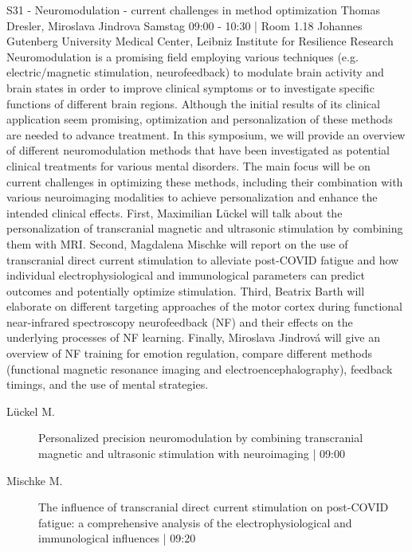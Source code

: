 
            \begin{symposium}
            {S31 - Neuromodulation - current challenges in method optimization}
            {Thomas Dresler, Miroslava Jindrova}
            {Samstag 09:00 - 10:30 | Room 1.18}
            {Johannes Gutenberg University Medical Center, Leibniz Institute for Resilience Research}
            Neuromodulation is a promising field employing various techniques (e.g. electric/magnetic stimulation, neurofeedback) to modulate brain activity and brain states in order to improve clinical symptoms or to investigate specific functions of different brain regions. Although the initial results of its clinical application seem promising, optimization and personalization of these methods are needed to advance treatment. In this symposium, we will provide an overview of different neuromodulation methods that have been investigated as potential clinical treatments for various mental disorders. The main focus will be on current challenges in optimizing these methods, including their combination with various neuroimaging modalities to achieve personalization and enhance the intended clinical effects. First, Maximilian Lückel will talk about the personalization of transcranial magnetic and ultrasonic stimulation by combining them with MRI. Second, Magdalena Mischke will report on the use of transcranial direct current stimulation to alleviate post-COVID fatigue and how individual electrophysiological and immunological parameters can predict outcomes and potentially optimize stimulation. Third, Beatrix Barth will elaborate on different targeting approaches of the motor cortex during functional near-infrared spectroscopy neurofeedback (NF) and their effects on the underlying processes of NF learning. Finally, Miroslava Jindrová will give an overview of NF training for emotion regulation, compare different methods (functional magnetic resonance imaging and electroencephalography), feedback timings, and the use of mental strategies.
            \begin{description}    
            
                \item [ Lückel M.] Personalized precision neuromodulation by combining transcranial magnetic and ultrasonic stimulation with neuroimaging \textcolor{mygray}{ | 09:00}    
                
                \item [ Mischke M.] The influence of transcranial direct current stimulation on post-COVID fatigue: a comprehensive analysis of the electrophysiological and immunological influences \textcolor{mygray}{ | 09:20}    
                

\end{description}
\end{symposium}
